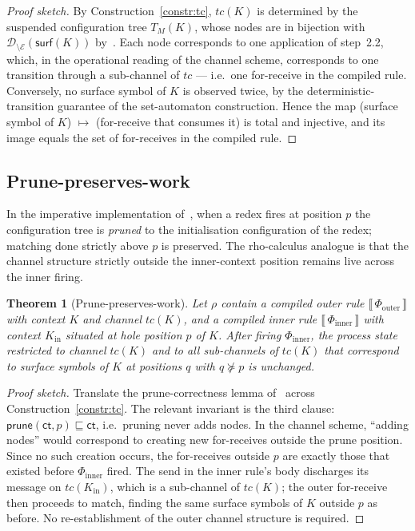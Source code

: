 \documentclass[11pt]{article}
\theoremstyle{plain}
\newtheorem{theorem}{Theorem}[section]
\theoremstyle{definition}
\theoremstyle{remark}
\newcommand{\sem}[1]{\llbracket\,#1\,\rrbracket}
\newcommand{\dom}{\mathcal{D}}
\newcommand{\edges}{\mathcal{E}}
\newcommand{\surface}{\mathsf{surf}}
\begin{document}
\begin{proof}[Proof sketch]
By Construction~\ref{constr:tc}, $tc(K)$ is determined by the suspended
configuration tree $T_{M}(K)$, whose nodes are in bijection with
$\dom_{\setminus\edges}(\surface(K))$ by~\cite[Theorem~1]{BouwmanErkens2022}.
Each node corresponds to one application of step~2.2, which, in the
operational reading of the channel scheme, corresponds to one transition
through a sub-channel of $tc$ --- i.e.\ one for-receive in the compiled
rule. Conversely, no surface symbol of $K$ is observed twice, by the
deterministic-transition guarantee of the set-automaton construction.
Hence the map (surface symbol of $K$) $\mapsto$ (for-receive that
consumes it) is total and injective, and its image equals the set of
for-receives in the compiled rule.
\end{proof}

\subsection{Prune-preserves-work}

In the imperative implementation of~\cite{BouwmanErkens2022}, when a redex
fires at position $p$ the configuration tree is \emph{pruned} to the
initialisation configuration of the redex; matching done strictly above $p$
is preserved. The rho-calculus analogue is that the channel structure
strictly outside the inner-context position remains live across the inner
firing.

\begin{theorem}[Prune-preserves-work]\label{thm:prune-preserves}
Let $\rho$ contain a compiled outer rule $\sem{\Phi_{\mathrm{outer}}}$ with
context $K$ and channel $tc(K)$, and a compiled inner rule
$\sem{\Phi_{\mathrm{inner}}}$ with context $K_{\mathrm{in}}$ situated at
hole position $p$ of $K$. After firing $\Phi_{\mathrm{inner}}$, the
process state restricted to channel $tc(K)$ and to all sub-channels of
$tc(K)$ that correspond to surface symbols of $K$ at positions $q$ with
$q \not\succeq p$ is unchanged.
\end{theorem}

\begin{proof}[Proof sketch]
Translate the prune-correctness lemma of~\cite[Lemma~1]{BouwmanErkens2022}
across Construction~\ref{constr:tc}. The relevant invariant is the third
clause: $\mathsf{prune}(\mathsf{ct}, p) \sqsubseteq \mathsf{ct}$, i.e.\
pruning never adds nodes. In the channel scheme, ``adding nodes'' would
correspond to creating new for-receives outside the prune position. Since
no such creation occurs, the for-receives outside $p$ are exactly those
that existed before $\Phi_{\mathrm{inner}}$ fired. The send in the inner
rule's body discharges its message on $tc(K_{\mathrm{in}})$, which is a
sub-channel of $tc(K)$; the outer for-receive then proceeds to match,
finding the same surface symbols of $K$ outside $p$ as before. No
re-establishment of the outer channel structure is required.
\end{proof}
\end{document}

